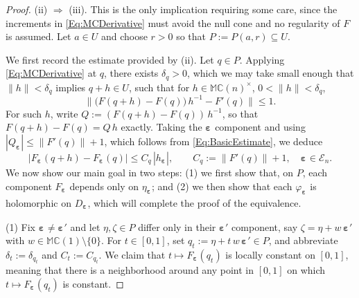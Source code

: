 \documentclass[10pt,a4paper]{amsart}
\newcommand{\Ra}{\Rightarrow}
\newcommand{\bep}[1]{\bm{\varepsilon_{#1}}}
\newcommand{\mC}{\mathbb{C}}
\newcommand{\mM}{\mathbb{M}}
\begin{document}
\begin{proof}
    (ii) $\Ra$ (iii). This is the only implication requiring some care, since
    the increments in \eqref{Eq:MCDerivative} must avoid the null cone and no
    regularity of $F$ is assumed. Let $a \in U$ and choose $r > 0$ so that
    $P := P ( a , r ) \subseteq U$.

    We first record the estimate provided by (ii). Let $q \in P$. Applying
    \eqref{Eq:MCDerivative} at $q$, there exists
    $\delta_q > 0$, which we may take small enough that
    $\| h \| < \delta_q$ implies $q + h \in U$, such that for $h \in \mM \mC(n)^\times$, $0 < \| h \| < \delta_q$,
        \begin{equation}\label{Eq:BasicEstimate}
        \big\| \big( F ( q + h ) - F ( q ) \big)\, h^{-1} - F ' ( q ) \big\|
        \leq 1 .
        \end{equation}
    For such $h$, write $Q := ( F ( q + h ) - F ( q ) )\, h^{-1}$, so that
    $F ( q + h ) - F ( q ) = Q\, h$ exactly. Taking the $\bep{}$ component and
    using $| Q_{\bep{}} | \leq \| F ' ( q ) \| + 1$, which follows from
    \eqref{Eq:BasicEstimate}, we deduce
        \begin{equation}\label{Eq:ComponentEstimate}
        \big| F_{\bep{}} ( q + h ) - F_{\bep{}} ( q ) \big| \leq C_q\, | h_{\bep{}} | ,
        \qquad C_q := \| F ' ( q ) \| + 1 , \quad \bep{} \in \mathcal{E}_n.
        \end{equation}
    We now show our main goal in two steps: (1) we first show that, on $P$, each component $F_{\bep{}}$ depends only on $\eta_{\bep{}}$; and (2) we then show that each $\varphi_{\bep{}}$ is holomorphic on $D_{\bep{}}$, which will complete the proof of the equivalence.

    (1) Fix $\bep{} \neq \bep{}'$ and let $\eta , \zeta \in P$ differ only in their
    $\bep{}'$ component, say $\zeta = \eta + w\, \bep{}'$ with
    $w \in \mM \mC(1) \setminus \{ 0 \}$. For $t \in [ 0 , 1 ]$, set
    $q_t := \eta + t\, w\, \bep{}' \in P$, and abbreviate
    $\delta_t := \delta_{q_t}$ and $C_t := C_{q_t}$. We claim that
    $t \mapsto F_{\bep{}} ( q_t )$ is locally constant on $[ 0 , 1 ]$, meaning that there is a neighborhood around any point in $[0, 1]$ on which $t \mapsto F_{\bep{}} (q_t)$ is constant.


\end{proof}
\end{document}
